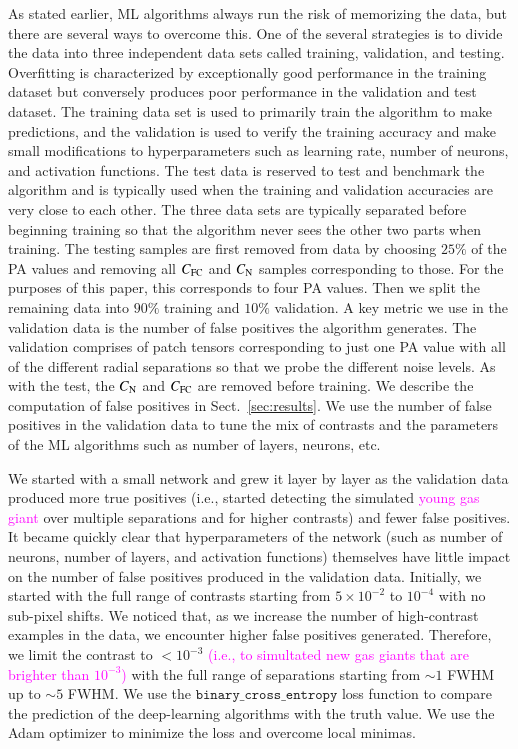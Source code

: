 \documentclass[referee]{aa} %
\newcommand{\newchange}[1]{\textcolor{magenta}{#1}}
\begin{document}
As stated earlier, ML algorithms always run the risk of memorizing the data, but there are several ways to overcome this.
One of the several strategies is to divide the data into three independent data sets called training, validation, and testing.
Overfitting is characterized by exceptionally good performance in the training dataset but conversely produces poor performance in the validation and test dataset.
The training data set is used to primarily train the algorithm to make predictions, and the validation is used to verify the training accuracy and make small modifications to hyperparameters such as learning rate, number of neurons, and activation functions. %
The test data is reserved to test and benchmark the algorithm and is typically used when the training and validation accuracies are very close to each other.
The three data sets are typically separated before beginning training so that the algorithm never sees the other two parts when training.
The testing samples are first removed from data by choosing $25\%$ of the PA values and removing all $C_{\rm FC}$ and $C_{\rm N}$ samples corresponding to those. 
For the purposes of this paper, this corresponds to four PA values.
Then we split the remaining data into $90\%$ training and $10\%$ validation.
A key metric we use in the validation data is the number of false positives the algorithm generates. 
The validation comprises of patch tensors corresponding to just one PA value with all of the different radial separations so that we probe the different noise levels.
As with the test, the $C_{\rm N}$ and $C_{\rm FC}$ are removed before training.
We describe the computation of false positives in Sect.~\ref{sec:results}.
We use the number of false positives in the validation data to tune the mix of contrasts and the parameters of the ML algorithms such as number of layers, neurons, etc.

We started with a small network and grew it layer by layer as the validation data produced more true positives (i.e., started detecting the simulated \newchange{young gas giant} over multiple separations and for higher contrasts) and fewer false positives.
It became quickly clear that hyperparameters of the network (such as number of neurons, number of layers, and activation functions) themselves have little impact on the number of false positives produced in the validation data.
Initially, we started with the full range of contrasts starting from $5\times10^{-2}$ to $10^{-4}$ with no sub-pixel shifts.
We noticed that, as we increase the number of high-contrast examples in the data, we encounter higher false positives generated. Therefore, we limit the contrast to $<10^{-3}$ \newchange{(i.e., to simultated new gas giants that are brighter than $10^{-3}$)} with the full range of separations starting from $\sim 1$ FWHM up to $\sim 5$ FWHM.
We use the $\texttt{binary\_cross\_entropy}$ loss function \citep{1993Li} to compare the prediction of the deep-learning algorithms with the truth value.
We use the Adam optimizer \citep{2014Adam} to minimize the loss and overcome local minimas.
\end{document}
